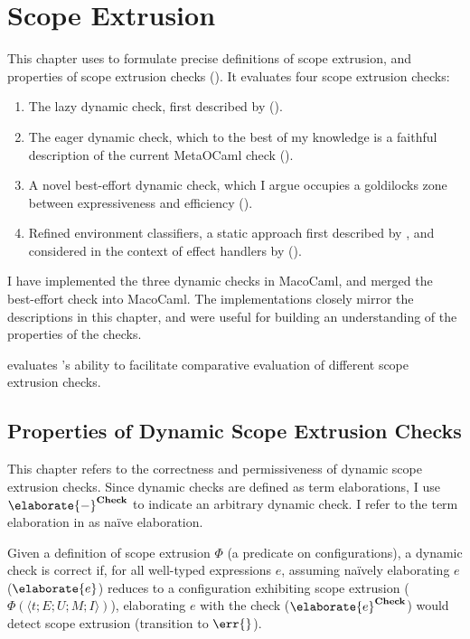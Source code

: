 \newcommand{\scoped}[2][\Theta]{\textsf{Scoped}_{{#1}, {#2}}}

\chapter{Scope Extrusion}\label{chapter:scope-extrusion}
This chapter uses \calculusName{} to formulate precise definitions of scope extrusion, and properties of scope extrusion checks (). It evaluates four scope extrusion checks: 
\begin{enumerate}
  \item The lazy dynamic check, first described by \citet{kiselyov-14} ().
  \item The eager dynamic check, which to the best of my knowledge is a faithful description of the current MetaOCaml check \citep{kiselyov-14} ().
  \item A novel best-effort dynamic check, which I argue occupies a goldilocks zone between expressiveness and efficiency ().
  \item Refined environment classifiers, a static approach first described by \citet{kiselyov-16}, and considered in the context of effect handlers by \citet{isoda-24} ().
\end{enumerate}
I have implemented the three dynamic checks in MacoCaml, and merged the best-effort check into MacoCaml. The implementations closely mirror the descriptions in this chapter, and were useful for building an understanding of the properties of the checks. 

 evaluates \calculusName{}'s ability to facilitate comparative evaluation of different scope extrusion checks. 
\section{Properties of Dynamic Scope Extrusion Checks}\label{section:properties}
This chapter refers to the correctness and permissiveness of dynamic scope extrusion checks. Since dynamic checks are defined as term elaborations, I use $\elaborate{-}^{\textbf{Check}}$ to indicate an arbitrary dynamic check. I refer to the term elaboration in  as naïve elaboration.

Given a definition of scope extrusion $\Phi$ (a predicate on configurations), a dynamic check is correct if, for all well-typed \sourceLang{} expressions $e$, assuming naïvely elaborating $e$ ($\elaborate{e}$) reduces to a configuration exhibiting scope extrusion ($\Phi(\langle t;E;U;M;I\rangle)$), elaborating $e$ with the check ($\elaborate{e}^{\textbf{Check}}$) would detect scope extrusion (transition to $\err{}$).

